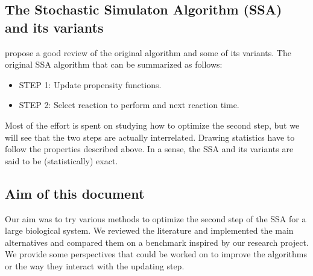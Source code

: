 \documentclass[12pt]{scrartcl}
\theoremstyle{definition}
\theoremstyle{remark}
\numberwithin{equation}{section}
\begin{document}
\subsection{The Stochastic Simulaton Algorithm (SSA) and its variants}

\citet{gillespie_perspective:_2013} propose a good review of the original algorithm and some of its variants. The original SSA algorithm that can be summarized as follows:

\begin{itemize}
\item STEP 1: Update propensity functions.
\item STEP 2: Select reaction to perform and next reaction time.
\end{itemize}

Most of the effort is spent on studying how to optimize the second step, but we will see that the two steps are actually interrelated. Drawing statistics have to follow the properties described above. In a sense, the SSA and its variants are said to be (statistically) exact.

\subsection{Aim of this document}

Our aim was to try various methods to optimize the second step of the SSA for a large biological system. We reviewed the literature and implemented the main alternatives and compared them on a benchmark inspired by our research project. We provide some perspectives that could be worked on to improve the algorithms or the way they interact with the updating step.






\appendix




\end{document}
